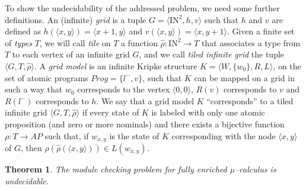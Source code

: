 \documentclass{LMCS}
\theoremstyle{plain}
\def \Naturals      {\mbox{I$\!$N}}
\newcommand \tpl[1] {\langle #1 \rangle}
\newtheorem{theorem}{Theorem}
\begin{document}
To show the undecidability of the addressed problem, we need some
further definitions. An (infinite) \emph{grid} is a tuple $G =
\tpl{\Naturals^2, h, v}$ such that $h$ and $v$ are defined as
$h(\tpl{x,y}) = \tpl{x+1,y}$ and $v(\tpl{x,y}) = \tpl{x,y+1}$.
Given a finite set of \emph{types} $T$, we will call \emph{tile}
on $T$ a function $\hat{\rho} : \Naturals^2 \rightarrow T$ that
associates a type from $T$ to each vertex of an infinite grid $G$,
and we call \emph{tiled infinite grid} the tuple
$\tpl{G,T,\hat{\rho}}$. A {\em grid model} is an infinite Kripke
structure $K = \tpl{W,\{w_0\},R,L}$, on the set of atomic programs
$Prog = \{l^-,v\}$, such that $K$ can be mapped on a grid in such
a way that $w_0$ corresponds to the vertex $\tpl{0,0}$, $R(v)$
corresponds to $v$ and $R(l^-)$ corresponds to $h$. We say that a
grid model $K$ ``corresponds'' to a tiled infinite grid
$\tpl{G,T,\hat{\rho}}$ if every state of $K$ is labeled with only
one atomic proposition (and zero or more nominals) and there
exists a bijective function $\rho : T \rightarrow AP$ such that,
if $w_{x,y}$ is the state of $K$ corresponding with the node
$\tpl{x,y}$ of $G$, then $\rho(\hat{\rho}(\tpl{x,y})) \in
L(w_{x,y})$.

\begin{theorem}\label{the:undecidability}
The module checking problem for fully enriched $\mu$--calculus is
undecidable.
\end{theorem}
\end{document}
